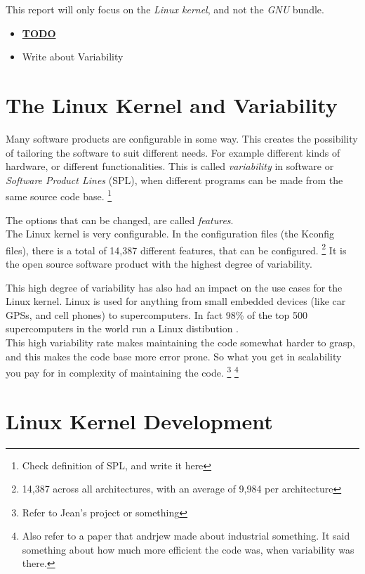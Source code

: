 \documentclass[a4paper,11pt]{report}
\begin{document}
This report will only focus on the \emph{Linux kernel}, and not the \emph{GNU} 
bundle.

\begin{itemize}
    \item \underline{\textbf{TODO}}
    \item Write about Variability
\end{itemize}


        \section{The Linux Kernel and Variability}


Many software products are configurable in some way. This creates the 
possibility of tailoring the software to suit different needs. For example 
different kinds of hardware, or different functionalities. This is called 
\emph{variability} in software or \emph{Software Product Lines} (SPL), when 
different programs can be made from the same source code base.
    \footnote{Check definition of SPL, and write it here}

The options that can be changed, are called \emph{features}.
\\

The Linux kernel is very configurable. In the configuration files (the Kconfig 
files), there is a total of 14,387 different features, that can be configured.
    \footnote {14,387 across all architectures, with an average of 9,984 per 
        architecture}
It is the open source software product with the highest degree of variability.

This high degree of variability has also had an impact on the use cases for the 
Linux kernel. Linux is used for anything from small embedded devices (like car 
GPSs, and cell phones) to supercomputers.
In fact 98\% of the top 500 supercomputers in the world run a Linux distibution
    \cite{top500}
.
\\

This high variability rate makes maintaining the code somewhat harder to 
grasp, and this makes the code base more error prone. So what you get in 
scalability you pay for in complexity of maintaining the code. 
    \footnote{Refer to Jean's project or something}
    \footnote{Also refer to a paper that andrjew made about industrial 
        something. It said something about how much more efficient the code was,
        when variability was there.}


        \section{Linux Kernel Development}
\end{document}
